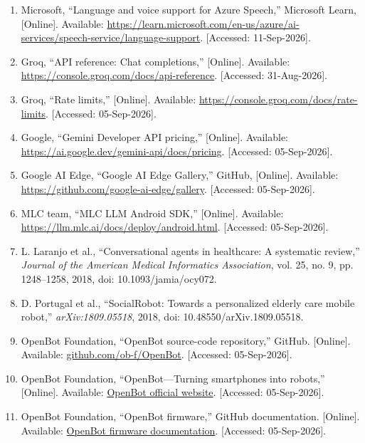 \begin{enumerate}
    \item \label{ref:azure_speech_languages} Microsoft, ``Language and voice support for Azure Speech,'' Microsoft Learn, [Online]. Available: \url{https://learn.microsoft.com/en-us/azure/ai-services/speech-service/language-support}. [Accessed: 11-Sep-2026].
    \item \label{ref:groq_api} Groq, ``API reference: Chat completions,'' [Online]. Available: \url{https://console.groq.com/docs/api-reference}. [Accessed: 31-Aug-2026].
    \item \label{ref:groq_limits} Groq, ``Rate limits,'' [Online]. Available: \url{https://console.groq.com/docs/rate-limits}. [Accessed: 05-Sep-2026].
    \item \label{ref:gemini_pricing} Google, ``Gemini Developer API pricing,'' [Online]. Available: \url{https://ai.google.dev/gemini-api/docs/pricing}. [Accessed: 05-Sep-2026].
    \item \label{ref:ai_edge_gallery} Google AI Edge, ``Google AI Edge Gallery,'' GitHub, [Online]. Available: \url{https://github.com/google-ai-edge/gallery}. [Accessed: 05-Sep-2026].
    \item \label{ref:mlc_android} MLC team, ``MLC LLM Android SDK,'' [Online]. Available: \url{https://llm.mlc.ai/docs/deploy/android.html}. [Accessed: 05-Sep-2026].
    \item \label{ref:healthcare_chatbot_review} L. Laranjo et al., ``Conversational agents in healthcare: A systematic review,'' \textit{Journal of the American Medical Informatics Association}, vol. 25, no. 9, pp. 1248--1258, 2018, doi: 10.1093/jamia/ocy072.
    \item \label{ref:socialrobot} D. Portugal et al., ``SocialRobot: Towards a personalized elderly care mobile robot,'' \textit{arXiv:1809.05518}, 2018, doi: 10.48550/arXiv.1809.05518.
    \item \label{ref:openbot_repo} OpenBot Foundation, ``OpenBot source-code repository,'' GitHub. [Online]. Available: \href{https://github.com/ob-f/OpenBot}{github.com/ob-f/OpenBot}. [Accessed: 05-Sep-2026].
    \item \label{ref:openbot_web} OpenBot Foundation, ``OpenBot---Turning smartphones into robots,'' [Online]. Available: \href{https://www.openbot.org/home}{OpenBot official website}. [Accessed: 05-Sep-2026].
    \item \label{ref:openbot_firmware} OpenBot Foundation, ``OpenBot firmware,'' GitHub documentation. [Online]. Available: \href{https://github.com/ob-f/OpenBot/tree/master/firmware}{OpenBot firmware documentation}. [Accessed: 05-Sep-2026].

\end{enumerate}
